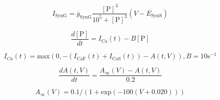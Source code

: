 \begin{displaymath}
I_{\mathrm{SynG}} = \overline{g}_{\mathrm{SynG}}\frac{[\mathrm{P}]^3}{10^5+[\mathrm{P}]^3}(V-E_{\mathrm{SynS}})\end{displaymath}

 \begin{displaymath}\frac{d[\mathrm{P}]}{dt} = I_{\mathrm{Ca}}(t) - B[\mathrm{P}]\end{displaymath}

 \begin{displaymath}I_{Ca}(t) = \mathrm{max}(0,-(I_{\mathrm{CaF}}(t)+I_{\mathrm{CaS}}(t))-A(t,V)), B = 10 {\mathrm{s}^{-1}}\end{displaymath}

 \begin{displaymath}\frac{dA(t,V)}{dt} = \frac{A_\infty(V) - A(t,V)}{0.2}\end{displaymath}

 \begin{displaymath}A_\infty(V) = 0.1/(1+\mathrm{exp}(-100(V+0.020)))\end{displaymath}








